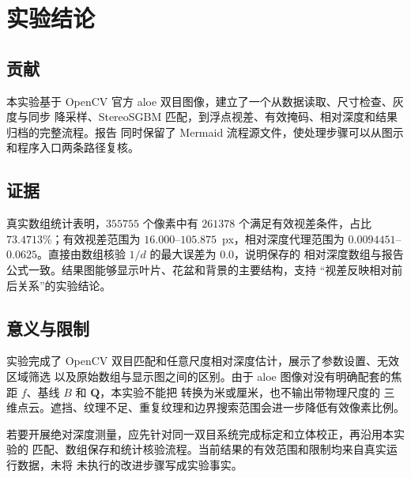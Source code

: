 \section{实验结论}

\subsection{贡献}

本实验基于 OpenCV 官方 aloe 双目图像，建立了一个从数据读取、尺寸检查、灰度与同步
降采样、StereoSGBM 匹配，到浮点视差、有效掩码、相对深度和结果归档的完整流程。报告
同时保留了 Mermaid 流程源文件，使处理步骤可以从图示和程序入口两条路径复核。

\subsection{证据}

真实数组统计表明，$355755$ 个像素中有 $261378$ 个满足有效视差条件，占比
$73.4713\%$；有效视差范围为 $16.000$--$105.875$~px，相对深度代理范围为
$0.0094451$--$0.0625$。直接由数组核验 $1/d$ 的最大误差为 $0.0$，说明保存的
相对深度数组与报告公式一致。结果图能够显示叶片、花盆和背景的主要结构，支持
“视差反映相对前后关系”的实验结论。

\subsection{意义与限制}

实验完成了 OpenCV 双目匹配和任意尺度相对深度估计，展示了参数设置、无效区域筛选
以及原始数组与显示图之间的区别。由于 aloe 图像对没有明确配套的焦距 $f$、基线 $B$
和 $\mathbf{Q}$，本实验不能把  转换为米或厘米，也不输出带物理尺度的
三维点云。遮挡、纹理不足、重复纹理和边界搜索范围会进一步降低有效像素比例。

若要开展绝对深度测量，应先针对同一双目系统完成标定和立体校正，再沿用本实验的
匹配、数组保存和统计核验流程。当前结果的有效范围和限制均来自真实运行数据，未将
未执行的改进步骤写成实验事实。
